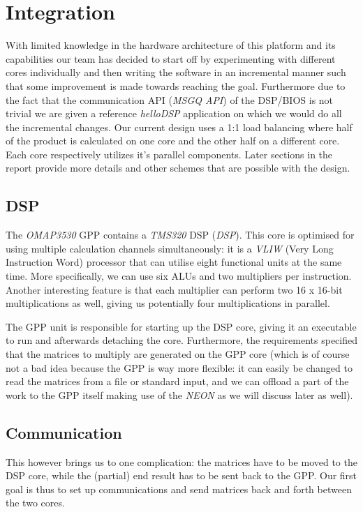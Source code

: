 \section{Integration}
With limited knowledge in the hardware architecture of this platform and its capabilities our team has decided to start off by experimenting with different cores individually and then writing the software in an incremental manner such that some improvement is made towards reaching the goal. Furthermore due to the fact that the communication API (\emph{MSGQ API}) of the DSP/BIOS is not trivial we are given a reference \emph{helloDSP} application on which we would do all the incremental changes.
Our current design uses a 1:1 load balancing where half of the product is calculated on one core and the other half on a different core. Each core respectively utilizes it's parallel components. Later sections in the report provide more details and other schemes that are possible with the design.

\subsection{DSP}
The \emph{OMAP3530} GPP contains a \emph{TMS320} DSP (\emph{DSP})\cite{gpp-refman}. This
core is optimised for using multiple calculation channels simultaneously: it is
a \emph{VLIW} (Very Long Instruction Word) processor that can utilise eight
functional units at the same time. More specifically, we can use six ALUs and
two multipliers per instruction. Another interesting feature is that each
multiplier can perform two 16 x 16-bit multiplications as well\cite{dsp-refman}, giving us
potentially four multiplications in parallel.

The GPP unit is responsible for starting up the DSP core, giving it an executable to run
and afterwards detaching the core. Furthermore, the requirements specified
that the matrices to multiply are generated on the GPP core (which is
of course not a bad idea because the GPP is way more flexible: it can easily
be changed to read the matrices from a file or standard input, and we can
offload a part of the work to the GPP itself making use of the \emph{NEON} as we
will discuss later as well).

\subsection{Communication}
This however brings us to one complication: the matrices have to be moved to
the DSP core, while the (partial) end result has to be sent back to the GPP.
Our first goal is thus to set up communications and send matrices back and forth
between the two cores.

